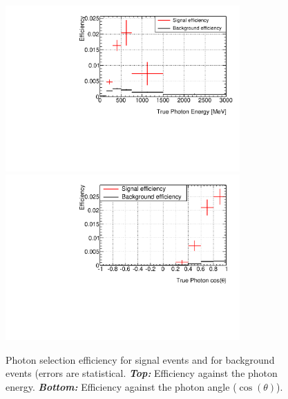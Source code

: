 \begin{figure}[ht]
  \center
  \includegraphics[width=0.8\textwidth]{images/NCg/Eff_gamma_mom.pdf}\\
  \includegraphics[width=0.8\textwidth]{images/NCg/Eff_gamma_cos.pdf}
  \caption[Photon selection efficiency for signal events and for
  background events against photon energy and photon angle
  ($\cos(\theta)$).]{Photon selection efficiency for signal events and
    for background events (errors are
    statistical. \textbf{\textit{Top:}} Efficiency against the photon
    energy. \textbf{\textit{Bottom:}} Efficiency against the photon
    angle ($\cos(\theta)$).}
  \label{fig:photoneff1}
\end{figure}

